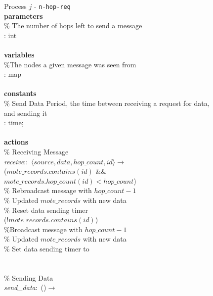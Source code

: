 \begin{figure}[H]
  \centering
  \begin{boxedminipage}{\linewidth}
    \null Process $j$ - \verb|n-hop-req|\\
    \null \textbf{parameters}\\
    \null\qq \% The number of hops left to send a message\\
    \null\qq {}: int\\~\\
    \null \textbf{variables}\\
    \null\qq \%The nodes a given message was seen from\\
    \null\qq {}: map\\~\\
    \null \textbf{constants}\\
    \null\qq \% Send Data Period, the time between receiving a request for data, and sending it\\
    \null\qq {}: time;\\~\\
    \null \textbf{actions}\\
    \null\qq \% Receiving Message\\
    \null\qq \emph{receive}::~$\langle source, data, hop\_count, id\rangle \rightarrow$\\
    \null\qq\qq {} ($mote\_records.contains(id)$ \&\& $mote\_records.hop\_count(id) < hop\_count$)  \\
    \null\qq\qq\qq \% Rebroadcast message with $hop\_count -1$ \\
    \null\qq\qq\qq \% Updated $mote\_records$ with new data \\
    \null\qq\qq\qq \% Reset data sending timer\\
    \null\qq\qq {} ($!mote\_records.contains(id)$) \\
    \null\qq\qq\qq \%Broadcast message with $hop\_count -1$\\
    \null\qq\qq\qq \% Updated $mote\_records$ with new data \\
    \null\qq\qq\qq \% Set data sending timer to  \\
    \null\qq\qq {}\\~\\
    \null\qq \% Sending Data\\
    \null\qq \emph{send\_data}:~()$\rightarrow$\\

\end{boxedminipage}
\end{figure}
